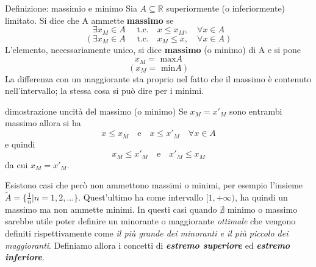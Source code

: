 \documentclass[x11names]{article}
\begin{document}
	
	\begin{center}
		\colorbox{myblue}{\begin{minipage}{5.75in}
				\begin{blues}{Definizione: massimio e minimo}
					Sia $A \subseteq \mathbb{R}$ superiormente (o inferiormente) limitato.
					Si dice che A ammette \textbf{massimo} se
					\[
					\exists x_M \in A \quad \text{ t.c.} \quad x \leq x_M, \quad \forall x \in A
					\]
					\[ 
					\left(\exists x_M \in A \quad \text{ t.c.} \quad x_M \leq x, \quad \forall x \in A\right)
					\]
					L'elemento, necessariamente unico, si dice \textbf{massimo} (o minimo)  di A e si pone 
					\[
					x_M = \text{ max}A 
					\]
					\[
					\left(x_M = \text{ min}A \right)
					\]
					La differenza con un maggiorante sta proprio nel fatto che il massimo è contenuto nell'intervallo; la stessa cosa si può dire per i minimi. 
				\end{blues}
		\end{minipage}}       
	\end{center}
	\begin{es}{dimostrazione uncità del massimo (o minimo)}
		Se $x_M = x'_M$ sono entrambi massimo allora si ha
		\[
		x \leq x_M \quad \text{e} \quad x \leq x'_M \quad \forall x \in A
		\]
		e quindi
		\[
		x_M \leq x'_M \quad \text{e} \quad x'_M \leq x_M
		\]
		da cui $x_M = x'_M$.
	\end{es}
	
	Esistono casi che però non ammettono massimi o minimi, per esempio l'insieme $\tilde{A} = \{ \frac{1}{n} | n = 1,2,\dots \}$. Quest'ultimo ha come intervallo $[1,+\infty)$, ha quindi un massimo ma non ammette minimi. In questi casi quando $\nexists$ minimo o massimo sarebbe utile poter definire un minorante o maggiorante \textit{ottimale} che vengono definiti rispettivamente come \textit{il più grande dei minoranti e il più piccolo dei maggioranti}. Definiamo allora i concetti di \textit{\textbf{estremo superiore}} ed \textit{\textbf{estremo inferiore}}.
	
\end{document}
